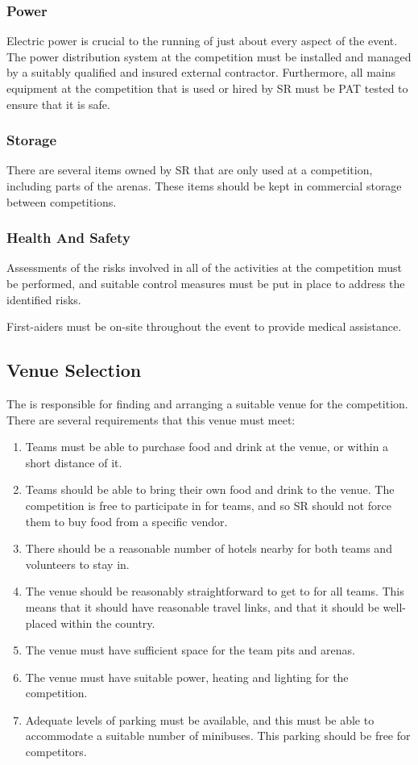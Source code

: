 \subsubsection{Power}

Electric power is crucial to the running of just about every aspect of the event.  The power distribution system at the competition must be installed and managed by a suitably qualified and insured external contractor.  Furthermore, all mains equipment at the competition that is used or hired by SR must be PAT tested to ensure that it is safe.

\subsubsection{Storage}

There are several items owned by SR that are only used at a competition, including parts of the arenas.  These items should be kept in commercial storage between competitions.

\subsubsection{Health And Safety}

Assessments of the risks involved in all of the activities at the competition must be performed, and suitable control measures must be put in place to address the identified risks.

First-aiders must be on-site throughout the event to provide medical assistance.

\subsection{Venue Selection}

The  is responsible for finding and arranging a suitable venue for the competition.  There are several requirements that this venue must meet:
\begin{enumerate}
\item Teams must be able to purchase food and drink at the venue, or within a short distance of it.
\item Teams should be able to bring their own food and drink to the venue.  The competition is free to participate in for teams, and so SR should not force them to buy food from a specific vendor.
\item There should be a reasonable number of hotels nearby for both teams and volunteers to stay in.
\item The venue should be reasonably straightforward to get to for all teams.  This means that it should have reasonable travel links, and that it should be well-placed within the country.
\item The venue must have sufficient space for the team pits and arenas.
\item The venue must have suitable power, heating and lighting for the competition.
    \item Adequate levels of parking must be available, and this must be able to accommodate a suitable number of minibuses.  This parking should be free for competitors.
\end{enumerate}


